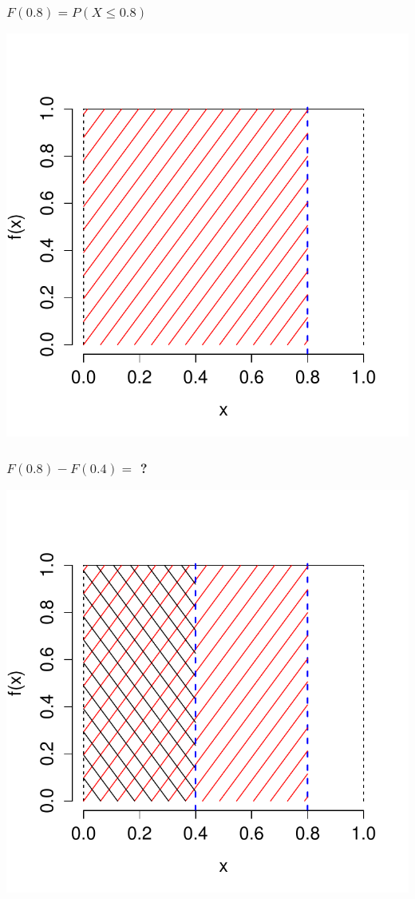 \documentclass[handout]{beamer}
\begin{document}
\begin{frame}
\frametitle{$F(0.8) = P(X \leq 0.8)$}

\centering
	\includegraphics[scale = 0.6]{./images/density_interval_cdf1}

\end{frame}


\begin{frame}
\frametitle{$F(0.8) - F(0.4) = $ ?}
\centering
	\includegraphics[scale = 0.6]{./images/density_interval_cdf2}

\end{frame}
\end{document}
